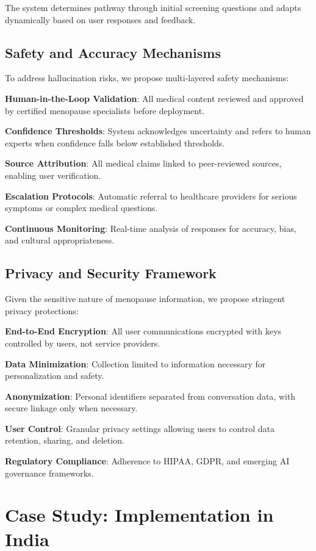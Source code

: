 \documentclass[letterpaper]{article} %
\begin{document}
The system determines pathway through initial screening questions and adapts dynamically based on user responses and feedback.

\subsection{Safety and Accuracy Mechanisms}

To address hallucination risks, we propose multi-layered safety mechanisms:

\textbf{Human-in-the-Loop Validation}: All medical content reviewed and approved by certified menopause specialists before deployment.

\textbf{Confidence Thresholds}: System acknowledges uncertainty and refers to human experts when confidence falls below established thresholds.

\textbf{Source Attribution}: All medical claims linked to peer-reviewed sources, enabling user verification.

\textbf{Escalation Protocols}: Automatic referral to healthcare providers for serious symptoms or complex medical questions.

\textbf{Continuous Monitoring}: Real-time analysis of responses for accuracy, bias, and cultural appropriateness.

\subsection{Privacy and Security Framework}

Given the sensitive nature of menopause information, we propose stringent privacy protections:

\textbf{End-to-End Encryption}: All user communications encrypted with keys controlled by users, not service providers.

\textbf{Data Minimization}: Collection limited to information necessary for personalization and safety.

\textbf{Anonymization}: Personal identifiers separated from conversation data, with secure linkage only when necessary.

\textbf{User Control}: Granular privacy settings allowing users to control data retention, sharing, and deletion.

\textbf{Regulatory Compliance}: Adherence to HIPAA, GDPR, and emerging AI governance frameworks.

\section{Case Study: Implementation in India}
\end{document}

